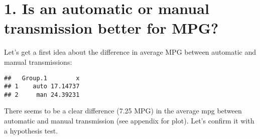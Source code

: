 \documentclass[
]{article}
\newenvironment{Shaded}{\begin{snugshade}}{\end{snugshade}}
\newcommand{\CommentTok}[1]{\textcolor[rgb]{0.56,0.35,0.01}{\textit{#1}}}
\newcommand{\DataTypeTok}[1]{\textcolor[rgb]{0.13,0.29,0.53}{#1}}
\newcommand{\DecValTok}[1]{\textcolor[rgb]{0.00,0.00,0.81}{#1}}
\newcommand{\KeywordTok}[1]{\textcolor[rgb]{0.13,0.29,0.53}{\textbf{#1}}}
\newcommand{\NormalTok}[1]{#1}
\newcommand{\OperatorTok}[1]{\textcolor[rgb]{0.81,0.36,0.00}{\textbf{#1}}}
\newcommand{\StringTok}[1]{\textcolor[rgb]{0.31,0.60,0.02}{#1}}
\begin{document}
\begin{Shaded}
\end{Shaded}

\hypertarget{is-an-automatic-or-manual-transmission-better-for-mpg}{%
\section{1. Is an automatic or manual transmission better for
MPG?}\label{is-an-automatic-or-manual-transmission-better-for-mpg}}

Let's get a first idea about the difference in average MPG between
automatic and manual transmissions:

\begin{Shaded}
\end{Shaded}

\begin{verbatim}
##   Group.1        x
## 1    auto 17.14737
## 2     man 24.39231
\end{verbatim}

There seems to be a clear difference (7.25 MPG) in the average mpg
between automatic and manual transmission (see appendix for plot). Let's
confirm it with a hypothesis test.
\end{document}
